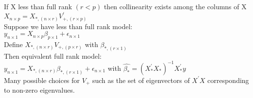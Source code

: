 \documentclass{article}
\newcommand{\B}{\beta}
\begin{document}
\begin{flushleft}
If X less than full rank $(r<p)$ then collinearity exists among the columns of X\\
$X_{n\times p} = X_{*,(n\times r)}V^{\prime}_{+,(r \times p)}$\\
Suppose we have less than full rank model:\\
$y_{n\times 1}=X_{n\times p}\B_{p\times 1}+\epsilon_{n\times 1}$\\
Define $X_{*,(n\times r)}V_{+,(p\times r)}$
with $\B_{*,(r\times 1)}$\\ Then equivalent full rank model:\\
$y_{n\times 1}=X_{*,(n\times r)}\B_{*,(r\times 1)}+\epsilon_{n\times 1}$ with $\hat{\B_*}=(X^{\prime}_*X_*)^{-1}X_*^{\prime}y$\\
Many possible choices for $V_+$ such as the set of eigenvectors of $X^{\prime}X$ corresponding to non-zero eigenvalues.\\
\end{flushleft}
\end{document}
